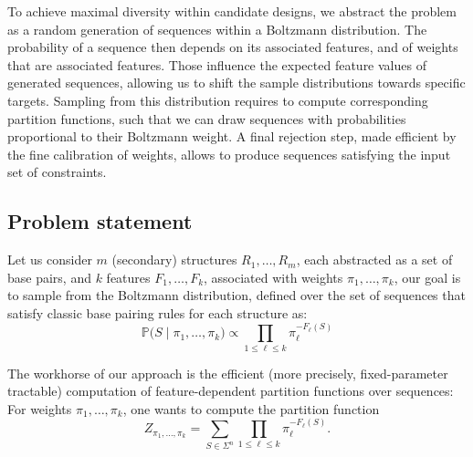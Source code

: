 \documentclass[]{bmcart}
\newcommand{\partfun}[1]{Z_{#1}}
\newcommand{\Nuc}[1]{{\sf #1}}
\newcommand{\Cb}{\Nuc{C}}
\newcommand{\Gb}{\Nuc{G}}
\newcommand{\GCb}{\Gb\Cb}
\renewcommand{\Pr}[1]{\mathbb{P}{#1}}
\begin{document}
To achieve maximal diversity within candidate designs, we abstract the problem as a random generation of sequences within a Boltzmann distribution. The probability of a sequence then depends on its associated features, and of weights that are associated features. Those influence the expected feature values of generated sequences, allowing us to shift the sample distributions towards specific targets. Sampling from this distribution requires to compute corresponding partition functions, such that we can draw sequences with probabilities proportional to their Boltzmann weight. A final rejection step, made efficient by the fine calibration of weights, allows to produce sequences satisfying the input set of constraints.
 
\subsection*{Problem statement}
\label{sec:problem-statement}
Let us consider $m$ (secondary) structures $R_1,\dots, R_m$, each abstracted as a set of base pairs, and $k$ features $F_1,\dots, F_k$, associated with weights $\pi_1,\dots,\pi_k$, our goal is to sample from the Boltzmann distribution, defined over the set of sequences that satisfy classic base pairing rules for each structure as: 
\begin{equation}
\label{eq:sample-distribution}
\Pr(S\mid\pi_1,\dots,\pi_k) \propto \displaystyle\prod_{1\leq \ell\leq k}\!\! \pi_\ell^{-F_\ell(S)} \end{equation}

The workhorse of our approach is the efficient (more precisely, fixed-parameter tractable) computation of feature-dependent partition functions over sequences:
For weights $\pi_1,\dots,\pi_k$, one wants to compute the partition function
  \begin{equation}
    \label{eq:mainproblem}
    \partfun{\pi_1,\dots,\pi_k} = \sum_{S\in\Sigma^n} \prod_{1\leq \ell\leq k} \pi_\ell^{-F_\ell(S)}.
  \end{equation}
\end{document}

